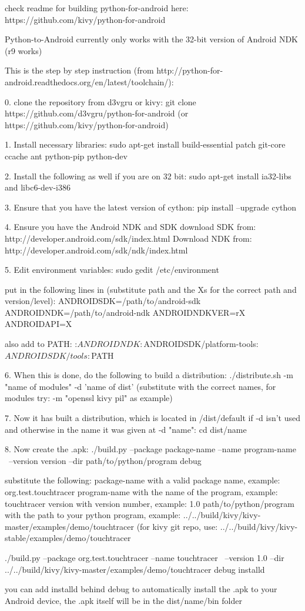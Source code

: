 check readme for building python-for-android here:
https://github.com/kivy/python-for-android

Python-to-Android currently only works with the 32-bit version of Android NDK (r9 works)

This is the step by step instruction (from http://python-for-android.readthedocs.org/en/latest/toolchain/):

0. clone the repository from d3vgru or kivy:
git clone https://github.com/d3vgru/python-for-android
(or https://github.com/kivy/python-for-android)

1. Install necessary libraries:
sudo apt-get install build-essential patch git-core ccache ant python-pip python-dev

2. Install the following as well if you are on 32 bit:
sudo apt-get install ia32-libs and libc6-dev-i386

3. Ensure that you have the latest version of cython:
pip install --upgrade cython

4. Ensure you have the Android NDK and SDK
	download SDK from: 	http://developer.android.com/sdk/index.html
	Download NDK from:	http://developer.android.com/sdk/ndk/index.html

5. Edit environment variables:
	sudo gedit /etc/environment
	
	put in the following lines in (substitute path and the Xs for the correct path and version/level):
	ANDROIDSDK=/path/to/android-sdk
	ANDROIDNDK=/path/to/android-ndk
	ANDROIDNDKVER=rX
	ANDROIDAPI=X

	also add to PATH:
	:$ANDROIDNDK:$ANDROIDSDK/platform-tools:$ANDROIDSDK/tools:$PATH

6. When this is done, do the following to build a distribution:
./distribute.sh -m "name of modules" -d 'name of dist'
(substitute with the correct names, for modules try: -m "openssl kivy pil" as example)

7. Now it has built a distribution, which is located in /dist/default if -d isn't used and otherwise in the name it was given at -d "name":
cd dist/name

8. Now create the .apk:
./build.py --package package-name --name program-name \
--version version --dir path/to/python/program debug

substitute the following:
package-name with a valid package name, example: org.test.touchtracer
program-name with the name of the program, example: touchtracer
version with version number, example: 1.0
path/to/python/program with the path to your python program, example: ../../build/kivy/kivy-master/examples/demo/touchtracer (for kivy git repo, use: ../../build/kivy/kivy-stable/examples/demo/touchtracer

./build.py --package org.test.touchtracer --name touchtracer \
--version 1.0 --dir ../../build/kivy/kivy-master/examples/demo/touchtracer debug installd

you can add installd behind debug to automatically install the .apk to your Android device, the .apk itself will be in the dist/name/bin folder

